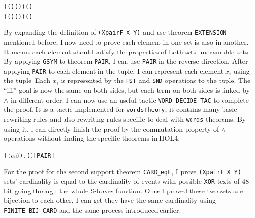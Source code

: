 \documentclass{article}
\begin{document}
\begin{alltt}
     \HOLTokenLeftbrace{} \HOLTokenBar{}   \HOLSymConst{\HOLTokenEor{}}  ( \HOLSymConst{\HOLTokenEor{}} ( \HOLSymConst{\HOLTokenExtract{}} ) ( )) \HOLSymConst{=} ( \HOLSymConst{\HOLTokenExtract{}} ) \HOLTokenRightbrace{} \HOLSymConst{\ensuremath{\times}}
     \HOLTokenLeftbrace{} \HOLTokenBar{}   \HOLSymConst{\HOLTokenEor{}}  ( \HOLSymConst{\HOLTokenEor{}} ( \HOLSymConst{\HOLTokenExtract{}} ) ( )) \HOLSymConst{=} ( \HOLSymConst{\HOLTokenExtract{}} ) \HOLTokenRightbrace{}
\end{alltt}

By expanding the definition of \verb|(XpairF X Y)| and use theorem \verb|EXTENSION| mentioned before, I now need to prove
each element in one set is also in another. It means each element should satisfy the properties of both sets.
measurable sets. By applying \verb|GSYM| to theorem \verb|PAIR|, I can use \verb|PAIR| in the reverse direction. After
applying \verb|PAIR| to each element in the tuple, I can represent each element $x_i$ using the tuple. Each $x_i$ is
represented by the \verb|FST| and \verb|SND| operations to the tuple. The ``iff'' goal is now the same on both sides, but
each term on both sides is linked by $\land$ in different order. I can now use an useful tactic \verb|WORD_DECIDE_TAC| to
complete the proof. It is a tactic implemented for \verb|wordsTheory|, it contains many basic rewriting rules and also
rewriting rules specific to deal with \verb|words| theorems. By using it, I can directly finish the proof by the
commutation property of $\land$ operations without finding the specific theorems in HOL4.

\begin{alltt}
\HOLTokenTurnstile{} \HOLSymConst{\HOLTokenForall{}}( :\ensuremath{\alpha} \HOLTokenProd{} \ensuremath{\beta}). ( \HOLSymConst{,} ) \HOLSymConst{=} \hfill{[PAIR]}
\end{alltt}

For the proof for the second support theorem \verb|CARD_eqF|, I prove \verb|(XpairF X Y)| sets' cardinality is
equal to the cardinality of events with possible \verb|XOR| texts of 48-bit going through the whole S-boxes function. Once I
proved these two sets are bijection to each other, I can get they have the same cardinality using \verb|FINITE_BIJ_CARD| and
the same process introduced earlier.
\end{document}
